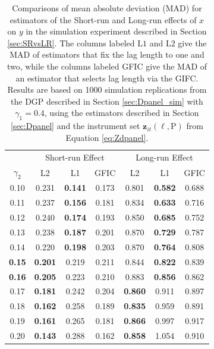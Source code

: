 \begin{table}[!hpt]
\centering
\small
\begin{tabular}{  c  c c  c  c c c  }
\hline
\hline
 & \multicolumn{3}{c}{Short-run Effect} & \multicolumn{3}{c}{Long-run Effect} \\
    $\gamma_2$ &      L2  &       L1   &    GFIC    & L2 &     L1 &   GFIC\\
    \hline
 0.10  &0.231&\bf{\color{blue}0.141}& 0.173& 0.801& \bf{\color{blue}0.582}& 0.688\\
  0.11 & 0.237& \bf{\color{blue}0.156}& 0.181& 0.834& \bf{\color{blue}0.633}& 0.716\\
 0.12   &0.240& \bf{\color{blue}0.174}& 0.193& 0.850& \bf{\color{blue}0.685}& 0.752\\
 0.13   &0.238& \bf{\color{blue}0.187}& 0.201& 0.870& \bf{\color{blue}0.729}& 0.787\\
 0.14 &0.220& \bf{\color{blue}0.198}& 0.203& 0.870& \bf{\color{blue}0.764}& 0.808\\
\bf{\color{red} 0.15}  & \bf{\color{blue}0.201}& 0.219& 0.211& 0.844& \bf{\color{blue}0.822}& 0.839\\
\bf{\color{red} 0.16}  & \bf{\color{blue}0.205}& 0.223& 0.210& 0.883& \bf{\color{blue}0.856}& 0.862\\
 0.17  &\bf{\color{blue}0.181}& 0.242& 0.204& \bf{\color{blue}0.860}& 0.911& 0.897\\
 0.18  & \bf{\color{blue}0.162}& 0.258& 0.189& \bf{\color{blue}0.835}& 0.959& 0.891\\
 0.19  &\bf{\color{blue}0.161}& 0.265& 0.181& \bf{\color{blue}0.866}& 0.997& 0.917\\
 0.20  &\bf{\color{blue}0.143}& 0.288& 0.162& \bf{\color{blue}0.858}& 1.054& 0.910 \\
\hline
 \hline
\end{tabular}
\caption{Comparisons of mean absolute deviation (MAD) for estimators of the Short-run and Long-run effects of $x$ on $y$ in the simulation experiment described in Section \ref{sec:SRvsLR}.
The columns labeled $\mbox{L1}$ and $\mbox{L2}$ give the MAD of estimators that fix the lag length to one and two, while the columns labeled GFIC give the MAD of an estimator that selects lag length via the GIFC.
Results are based on 1000 simulation replications from the DGP described in Section \ref{sec:Dpanel_sim} with $\gamma_1 = 0.4$, using the estimators described in Section \ref{sec:Dpanel} and the instrument set $\mathbf{z}_{it}(\ell, \text{P})$ from Equation \ref{eq:Zdpanel}.}
\label{tab:MAD_SRvsLR}
\end{table}		

